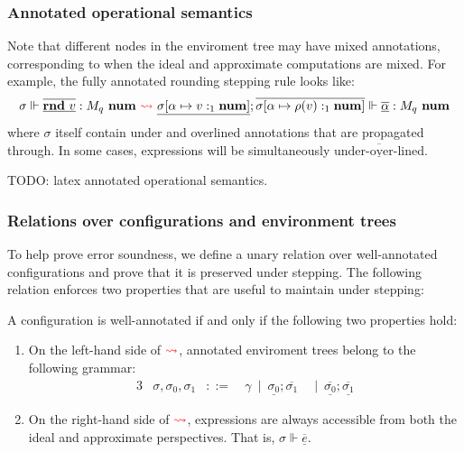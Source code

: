 \subsubsection{Annotated operational semantics}

Note that different nodes in the enviroment tree may have mixed annotations,
corresponding to when the ideal and approximate computations are mixed. For
example, the fully annotated rounding stepping rule looks like:
\begin{equation}\label{eq:rnd-annotated}
  \sigma \Vdash \underline{\overline{\mathbf{rnd} \ v}} : M_q \ \mathbf{num} \ \textcolor{red}{\rightsquigarrow} \
  \underline{\sigma [\alpha \mapsto v :_1 \mathbf{num}]}; \overline{\sigma [\alpha \mapsto \rho(v) :_1
  \mathbf{num}]} \Vdash \underline{\overline{\alpha}} : M_q \ \mathbf{num}
\end{equation}
where $\sigma$ itself contain under and overlined annotations that are
propagated through. In some cases, expressions will be simultaneously
$\underline{\overline{\text{under-over-lined}}}$. 

TODO: latex annotated operational semantics.

\subsubsection{Relations over configurations and environment trees}
To help prove error soundness, we define a unary relation over well-annotated
configurations and prove that it is preserved under stepping. The following
relation enforces two properties that are useful to maintain under stepping:
\begin{definition}
  A configuration is well-annotated if and only if the following two properties
  hold:
  \begin{enumerate}
    \item On the left-hand side of $\textcolor{red}{\rightsquigarrow}$, annotated
      enviroment trees belong to the following grammar:
      \begin{alignat*}{3}
            &\sigma, \sigma_0, \sigma_1 &::=~ & \gamma
            \ \mid \ \underline{\sigma_0}; \overline{\sigma_1}
            & \ \mid \ \overline{\underline{\sigma_0}}; \overline{\underline{\sigma_1}}
      \end{alignat*}
    \item On the right-hand side of $\textcolor{red}{\rightsquigarrow}$, 
      expressions are always accessible from both the ideal and approximate
      perspectives. That is, $\sigma \Vdash \underline{\overline{e}}$.
  \end{enumerate}
\end{definition}

